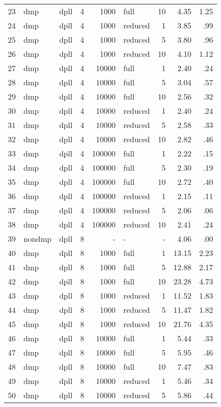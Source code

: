 \begin{center}
\begin{small}
\begin{longtable}{rllrrlrrr}
23 & dmp & dpll & 4 & 1000 & full & 10 & 4.35 & 1.25\\
24 & dmp & dpll & 4 & 1000 & reduced & 1 & 3.85 & .99\\
25 & dmp & dpll & 4 & 1000 & reduced & 5 & 3.80 & .96\\
26 & dmp & dpll & 4 & 1000 & reduced & 10 & 4.10 & 1.12\\
27 & dmp & dpll & 4 & 10000 & full & 1 & 2.40 & .24\\
28 & dmp & dpll & 4 & 10000 & full & 5 & 3.04 & .57\\
29 & dmp & dpll & 4 & 10000 & full & 10 & 2.56 & .32\\
30 & dmp & dpll & 4 & 10000 & reduced & 1 & 2.40 & .24\\
31 & dmp & dpll & 4 & 10000 & reduced & 5 & 2.58 & .33\\
32 & dmp & dpll & 4 & 10000 & reduced & 10 & 2.82 & .46\\
33 & dmp & dpll & 4 & 100000 & full & 1 & 2.22 & .15\\
34 & dmp & dpll & 4 & 100000 & full & 5 & 2.30 & .19\\
35 & dmp & dpll & 4 & 100000 & full & 10 & 2.72 & .40\\
36 & dmp & dpll & 4 & 100000 & reduced & 1 & 2.15 & .11\\
37 & dmp & dpll & 4 & 100000 & reduced & 5 & 2.06 & .06\\
38 & dmp & dpll & 4 & 100000 & reduced & 10 & 2.41 & .24\\
\hline
39 & nondmp & dpll & 8 & - & - & - & 4.06 & .00\\
40 & dmp & dpll & 8 & 1000 & full & 1 & 13.15 & 2.23\\
41 & dmp & dpll & 8 & 1000 & full & 5 & 12.88 & 2.17\\
42 & dmp & dpll & 8 & 1000 & full & 10 & 23.28 & 4.73\\
43 & dmp & dpll & 8 & 1000 & reduced & 1 & 11.52 & 1.83\\
44 & dmp & dpll & 8 & 1000 & reduced & 5 & 11.47 & 1.82\\
45 & dmp & dpll & 8 & 1000 & reduced & 10 & 21.76 & 4.35\\
46 & dmp & dpll & 8 & 10000 & full & 1 & 5.44 & .33\\
47 & dmp & dpll & 8 & 10000 & full & 5 & 5.95 & .46\\
48 & dmp & dpll & 8 & 10000 & full & 10 & 7.47 & .83\\
49 & dmp & dpll & 8 & 10000 & reduced & 1 & 5.46 & .34\\
50 & dmp & dpll & 8 & 10000 & reduced & 5 & 5.86 & .44\\

\end{longtable}
\end{small}
\end{center}
